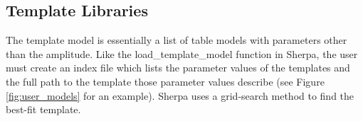 \subsection{Template Libraries}
The template model is essentially a list of table models with parameters other than the amplitude. Like the load_template_model function in Sherpa, the user must create an index file which lists the parameter values of the templates and the full path to the template those parameter values describe (see Figure \ref{fig:user_models} for an example). Sherpa uses a grid-search method to find the best-fit template.